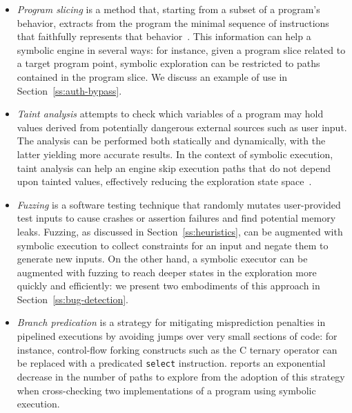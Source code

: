 \begin{itemize}

\item {\em Program slicing} is a method that, starting from a subset of a program's behavior, extracts from the program the minimal sequence of instructions that faithfully represents that behavior~\cite{Weiser84}. This information can help a symbolic engine in several ways: for instance, given a program slice related to a target program point, symbolic exploration can be restricted to paths contained in the program slice. We discuss an example of use in Section~\ref{ss:auth-bypass}.

\item {\em Taint analysis} attempts to check which variables of a program may hold values derived from potentially dangerous external sources such as user input. The analysis can be performed both statically and dynamically, with the latter yielding more accurate results. In the context of symbolic execution, taint analysis can help an engine skip execution paths that do not depend upon tainted values, effectively reducing the exploration state space~\cite{SAB-SP10}.

\item {\em Fuzzing} is a software testing technique that randomly mutates user-provided test inputs to cause crashes or assertion failures and find potential memory leaks. Fuzzing, as discussed in Section~\ref{ss:heuristics}, can be augmented with symbolic execution to collect constraints for an input and negate them to generate new inputs. On the other hand, a symbolic executor can be augmented with fuzzing to reach deeper states in the exploration more quickly and efficiently: we present two embodiments of this approach in Section~\ref{ss:bug-detection}.

\item {\em Branch predication} is a strategy for mitigating misprediction penalties in pipelined executions by avoiding jumps over very small sections of code: for instance, control-flow forking constructs such as the C ternary operator can be replaced with a predicated {\tt select} instruction. \cite{CCK-EUROSYS11} reports an exponential decrease in the number of paths to explore from the adoption of this strategy when cross-checking two implementations of a program using symbolic execution. %


\end{itemize}
